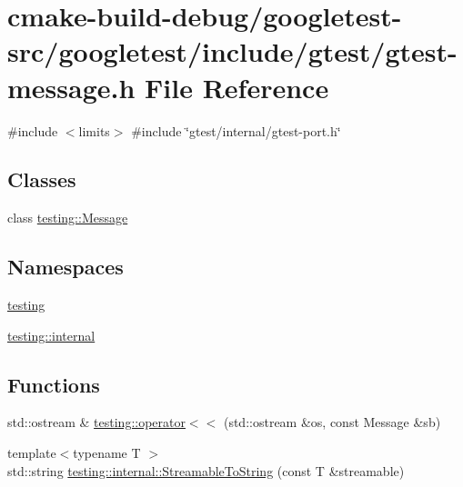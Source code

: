 \hypertarget{gtest-message_8h}{}\section{cmake-\/build-\/debug/googletest-\/src/googletest/include/gtest/gtest-\/message.h File Reference}
\label{gtest-message_8h}
{\ttfamily \#include $<$limits$>$}\newline
{\ttfamily \#include \char`\"{}gtest/internal/gtest-\/port.\+h\char`\"{}}\newline
\subsection*{Classes}
\begin{DoxyCompactItemize}
\item 
class \mbox{\hyperlink{classtesting_1_1Message}{testing\+::\+Message}}
\end{DoxyCompactItemize}
\subsection*{Namespaces}
\begin{DoxyCompactItemize}
\item 
 \mbox{\hyperlink{namespacetesting}{testing}}
\item 
 \mbox{\hyperlink{namespacetesting_1_1internal}{testing\+::internal}}
\end{DoxyCompactItemize}
\subsection*{Functions}
\begin{DoxyCompactItemize}
\item 
std\+::ostream \& \mbox{\hyperlink{namespacetesting_a7b802e532fd68749765cb7dc156130db}{testing\+::operator$<$$<$}} (std\+::ostream \&os, const Message \&sb)
\item 
{\footnotesize template$<$typename T $>$ }\\std\+::string \mbox{\hyperlink{namespacetesting_1_1internal_aad4beed95d0846e6ffc5da0978ef3bb9}{testing\+::internal\+::\+Streamable\+To\+String}} (const T \&streamable)
\end{DoxyCompactItemize}
